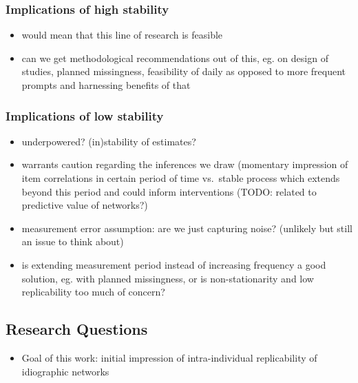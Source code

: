 \documentclass[
  english,
  man]{apa6}
\providecommand{\tightlist}{%
  \setlength{\itemsep}{0pt}\setlength{\parskip}{0pt}}
\begin{document}
\hypertarget{implications-of-high-stability}{%
\subsubsection{Implications of high stability}\label{implications-of-high-stability}}

\begin{itemize}
\tightlist
\item
  would mean that this line of research is feasible
\item
  can we get methodological recommendations out of this, eg. on design of studies, planned missingness, feasibility of daily as opposed to more frequent prompts and harnessing benefits of that
\end{itemize}

\hypertarget{implications-of-low-stability}{%
\subsubsection{Implications of low stability}\label{implications-of-low-stability}}

\begin{itemize}
\tightlist
\item
  underpowered? (in)stability of estimates?
\item
  warrants caution regarding the inferences we draw (momentary impression of item correlations in certain period of time vs.~stable process which extends beyond this period and could inform interventions (TODO: related to predictive value of networks?)
\item
  measurement error assumption: are we just capturing noise? (unlikely but still an issue to think about)
\item
  is extending measurement period instead of increasing frequency a good solution, eg. with planned missingness, or is non-stationarity and low replicability too much of concern?
\end{itemize}

\hypertarget{research-questions}{%
\subsection{Research Questions}\label{research-questions}}

\begin{itemize}
\tightlist
\item
  Goal of this work: initial impression of intra-individual replicability of idiographic networks
\end{itemize}
\end{document}

